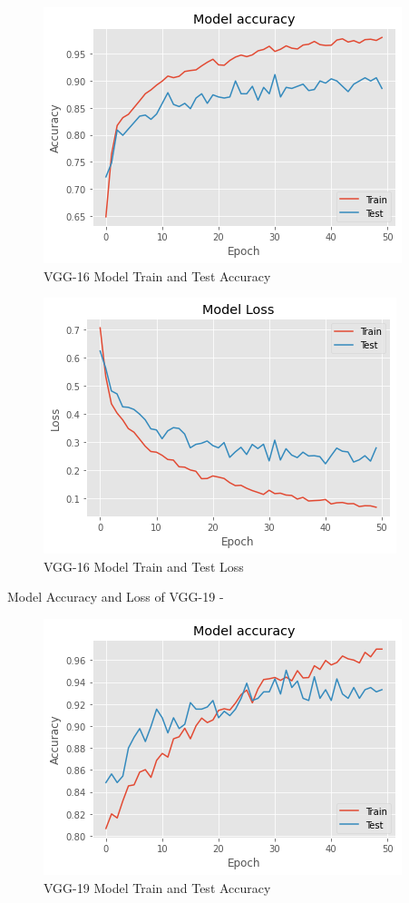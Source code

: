 \vspace{5mm}
\begin{figure}[hbt!]
\centering
\includegraphics[scale=1]{images/fig-25.png}
\caption{VGG-16 Model Train and Test Accuracy}
\label{fig:x VGG-16 Model Train and Test Accuracy}
\end{figure}

\vspace{5mm}
\begin{figure}[hbt!]
\centering
\includegraphics[scale=1]{images/fig-26.png}
\caption{VGG-16 Model Train and Test Loss}
\label{fig:x VGG-16 Model Train and Test Loss}
\end{figure}

\newpage
\noindent Model Accuracy and Loss of VGG-19 -

\vspace{5mm}
\begin{figure}[hbt!]
\centering
\includegraphics[scale=1]{images/fig-27.png}
\caption{VGG-19 Model Train and Test Accuracy}
\label{fig:x VGG-19 Model Train and Test Accuracy}
\end{figure}

